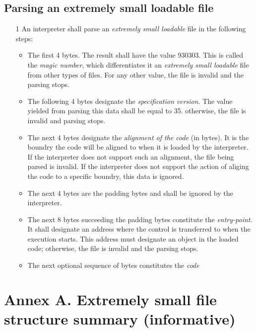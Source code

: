 \documentclass[a4paper]{article}
\begin{document}
    \subsection{Parsing an extremely small loadable file}

    \begin{enumerate}
        \item[1 ] An interpreter shall parse an \emph{extremely small loadable} file in the following steps:
            \begin{itemize}
                \item The first 4 bytes. The result shall have the value 930303. This is called the \emph{magic number}, which differentiates it an \emph{extremely small loadable} file from other types of files. For any other value, the file is invalid and the parsing stops.
                \item The following 4 bytes designate the \emph{specification version}. The value yielded from parsing this data shall be equal to 35. otherwise, the file is invalid and parsing stops.
                \item The next 4 bytes designate the \emph{alignment of the code} (in bytes). It is the boundry the code will be aligned to when it is loaded by the interpreter. If the interpreter does not support such an alignment, the file being parsed is invalid. If the interpreter does not support the action of aliging the code to a specific boundry, this data is ignored.
                \item The next 4 bytes are the padding bytes and shall be ignored by the interpreter.
                \item The next 8 bytes succeeding the padding bytes constitute the \emph{entry-point}. It shall designate an address where the control is transferred to when the execution starts. This address must designate an object in the loaded code; otherwise, the file is invalid and the parsing stops. 
                \item The next optional sequence of bytes constitutes the \emph{code}
            \end{itemize}
    \end{enumerate}

    \section{Annex A. Extremely small file structure summary (informative)}
\end{document}
